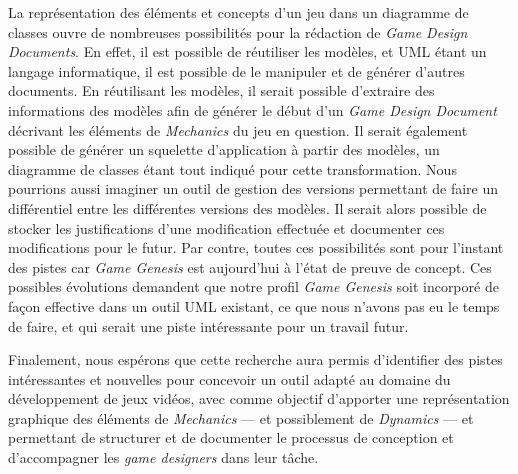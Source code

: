 \begin{conclusion}
La représentation des éléments et concepts d'un jeu dans un diagramme de classes ouvre de nombreuses possibilités pour la rédaction de \emph{Game Design Documents}.
En effet, il est possible de réutiliser les modèles, et UML étant un langage informatique, il est possible de le manipuler et de générer d'autres documents.
En réutilisant les modèles, il serait possible d'extraire des informations des modèles afin de générer le début d'un \emph{Game Design Document} décrivant les éléments de \emph{Mechanics} du jeu en question.
Il serait également possible de générer un squelette d'application à partir des modèles, un diagramme de classes étant tout indiqué pour cette transformation.
Nous pourrions aussi imaginer un outil de gestion des versions permettant de faire un différentiel entre les différentes versions des modèles.
Il serait alors possible de stocker les justifications d'une modification effectuée et documenter ces modifications pour le futur.
%
Par contre, toutes ces possibilités sont pour l'instant des pistes car \emph{Game Genesis} est aujourd'hui à l'état de preuve de concept.
Ces possibles évolutions demandent que notre profil
\emph{Game Genesis} soit incorporé de façon effective dans un outil
UML existant, ce que nous n'avons pas eu le temps de faire, et qui
serait une piste intéressante pour un travail futur.





Finalement, nous espérons que cette recherche aura permis d'identifier des pistes intéressantes et nouvelles pour concevoir un outil adapté au domaine du développement de jeux vidéos, avec comme objectif d'apporter une représentation graphique des éléments de \emph{Mechanics} --- et possiblement de \emph{Dynamics} --- et  permettant de structurer et de documenter le processus de conception et d'accompagner les \emph{game designers} dans leur tâche.



\end{conclusion}
